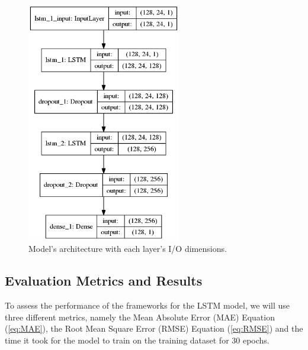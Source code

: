 \documentclass[a4paper, 12pt]{article}
\numberwithin{equation}{section}
\numberwithin{figure}{section}
\numberwithin{table}{section}
\begin{document}
	\begin{figure}[H]
		\centering
		\includegraphics[height=0.6\textheight, width=0.6\textwidth, keepaspectratio]{LSTM_keras.png}
		\caption{Model's architecture with each layer's  I/O dimensions.}
		\label{fig:lstm_keras_io}
	\end{figure}
	
	

		
	\newpage
	
	\subsection{Evaluation Metrics and Results}
	
	To assess the performance of the frameworks for the LSTM model, we will use three different metrics, namely the Mean Absolute Error (MAE) Equation (\ref{eq:MAE}), the Root Mean Square Error (RMSE) Equation (\ref{eq:RMSE}) and the time it took for the model to train on the training dataset for 30 epochs.
	
\end{document}
